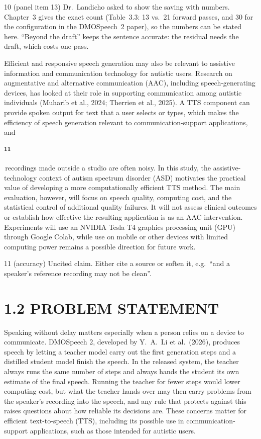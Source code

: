 \documentclass[11pt,a4paper]{article}
\newcommand{\flag}[2]{\colorbox{flagcol}{\strut\textsuperscript{\bfseries #1}}\,{#2}}
\newcounter{cmt}
\begin{document}
\begin{cmt}{10 (panel item 13)}
Dr.~Landicho asked to show the saving with numbers. Chapter~3 gives the exact count (Table~3.3: 13 vs.\ 21 forward passes, and 30 for the configuration in the DMOSpeech~2 paper), so the numbers can be stated here. ``Beyond the draft'' keeps the sentence accurate: the residual needs the draft, which costs one pass.
\end{cmt}

Efficient and responsive speech generation may also be relevant to assistive information and communication technology for autistic users. Research on augmentative and alternative communication (AAC), including speech-generating devices, has looked at their role in supporting communication among autistic individuals (Muharib et al., 2024; Therrien et al., 2025). A TTS component can provide spoken output for text that a user selects or types, which makes the efficiency of speech generation relevant to communication-support applications, and \flag{11}{recordings made outside a studio are often noisy}. In this study, the assistive-technology context of autism spectrum disorder (ASD) motivates the practical value of developing a more computationally efficient TTS method. The main evaluation, however, will focus on speech quality, computing cost, and the statistical control of additional quality failures. It will not assess clinical outcomes or establish how effective the resulting application is as an AAC intervention. Experiments will use an NVIDIA Tesla T4 graphics processing unit (GPU) through Google Colab, while use on mobile or other devices with limited computing power remains a possible direction for future work.

\begin{cmt}{11 (accuracy)}
Uncited claim. Either cite a source or soften it, e.g.\ ``and a speaker's reference recording may not be clean''.
\end{cmt}

\section*{1.2 PROBLEM STATEMENT}

Speaking without delay matters especially when a person relies on a device to communicate. DMOSpeech 2, developed by Y.\ A.\ Li et al.\ (2026), produces speech by letting a teacher model carry out the first generation steps and a distilled student model finish the speech. In the released system, the teacher always runs the same number of steps and always hands the student its own estimate of the final speech. Running the teacher for fewer steps would lower computing cost, but what the teacher hands over may then carry problems from the speaker's recording into the speech, and any rule that protects against this raises questions about how reliable its decisions are. These concerns matter for efficient text-to-speech (TTS), including its possible use in communication-support applications, such as those intended for autistic users.
\end{document}
